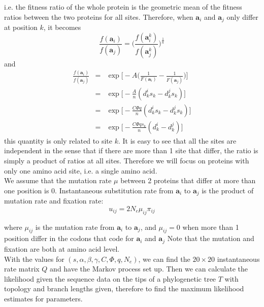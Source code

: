 \documentclass[13pt]{article}
\begin{document}
i.e. the fitness ratio of the whole protein is the geometric mean of the fitness ratios between the two proteins for all sites. Therefore, when $\mathbf{a}_i$ and $\mathbf{a}_j$ only differ at position $k$, it becomes  
\[\frac{f(\mathbf{a}_i)}{f(\mathbf{a}_j)} = \Big( \frac{f(\mathbf{a}_i^k)}{f(\mathbf{a}_j^k)}\Big)^{\frac{1}{n}}\]
and
\begin{eqnarray}
\frac{f(\mathbf{a}_i)}{f(\mathbf{a}_j)} & = &\exp \Big[-A\Big( \frac{1}{F(\mathbf{a}_i )} - \frac{1}{F(\mathbf{a}_j )}\Big)\Big] \nonumber\\
& = & \exp\Big[ -\frac{A}{n}(d_k^i s_k - d_k^j s_k)\Big]\\
& = & \exp\Big[ -\frac{C\Phi q}{n}(d_k^i s_k - d_k^j s_k)\Big]\\
& = & \exp\Big[ -\frac{C\Phi q s_k}{n}(d_k^i - d_k^j)\Big]
\end{eqnarray}
\noindent
this quantity is only related to site $k$. It is easy to see that all the sites are independent in the sense that if there are more than 1 site that differ, the ratio is simply a product of ratios at all sites. Therefore we will focus on proteins with only one amino acid site, i.e. a single amino acid.\\

We assume that the mutation rate $\mu$ between 2 proteins that differ at more than one position is 0. Instantaneous substitution rate from $\mathbf{a}_i$ to $\mathbf{a}_j$ is the product of mutation rate and fixation rate:
\begin{equation}
u_{ij} = 2N_e \mu_{ij} \pi_{ij}
\label{eq:subrate}
\end{equation}

where $\mu_{ij}$ is the mutation rate from $\mathbf{a}_i$ to $\mathbf{a}_j$, and $\mu_{ij} = 0$ when more than 1 position differ in the codons that code for $\mathbf{a}_i$ and $\mathbf{a}_j$ Note that the mutation and fixation are both at amino acid level. \\

With the values for $(s, \alpha, \beta, \gamma, C, \Phi, q, N_e)$, we can find the $20 \times 20$ instantaneous rate matrix $Q$ and have the Markov process set up. Then we can calculate the likelihood given the sequence data on the tips of a phylogenetic tree $T$ with topology and branch lengths given, therefore to find the maximum likelihood estimates for parameters. \\
\end{document}
